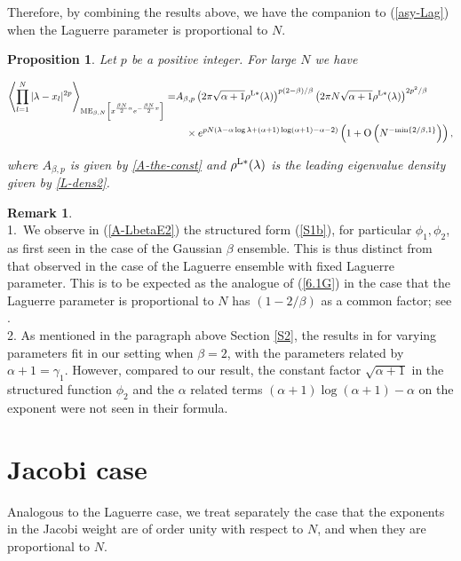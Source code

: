 \documentclass[11pt,a4paper]{article}
\numberwithin{equation}{section} %
\theoremstyle{plain}
\newtheorem{prop}{Proposition}
\theoremstyle{definition}
\newtheorem{remark}{Remark}
\numberwithin{prop}{section}
\numberwithin{cor}{section}
\numberwithin{remark}{section}
\begin{document}
Therefore, by combining the results above, we have the companion to (\ref{asy-Lag})
when the Laguerre parameter is proportional to $N$.
	\begin{prop}\label{pro-LbE2}
	Let $p$ be a positive integer. For large $N$ we have
	\begin{small}
	    \begin{align}\label{A-LbetaE2}
		\begin{aligned}
			\left\langle\prod_{l=1}^N |\lambda-x_l|^{2 p}\right\rangle_{\mathrm{ME}_{\beta, N}\left[x^{\frac{\beta N}{2}\alpha}e^{-{\beta N\over 2} x}\right]}=&A_{\beta, p}\left({2\pi\sqrt{\alpha+1}} \rho^{\rm L*}(\lambda)\right)^{p(2-\beta) / \beta}\left({2\pi N\sqrt{\alpha+1}} \rho^{\rm L*}(\lambda)\right)^{2 p^2 / \beta} \\
			&\quad\times e^{pN \left(\lambda-\alpha\log\lambda+(\alpha+1)\log(\alpha+1)-\alpha -2\right)}\left(1+\mathrm{O}\left( N^{-\mathrm{min}\{2/\beta,1\}}\right)\right),
		\end{aligned}
	\end{align}
	\end{small}
	where $A_{\beta, p}$ is given by \eqref{A-the-const} and $\rho^{\rm L*}(\lambda)$ is the leading eigenvalue density given by \eqref{L-dens2}.
\end{prop}


\begin{remark}\label{R-C1} ${}$ \\
1.~We observe in (\ref{A-LbetaE2}) the structured form (\ref{S1b}), for particular $\phi_1, \phi_2$, as first seen in the case of the Gaussian $\beta$ ensemble. This is thus distinct
from that observed in the case of the Laguerre ensemble with fixed Laguerre parameter. This is to be expected as the analogue of (\ref{6.1G}) in the case that the Laguerre parameter is proportional to $N$ has $(1-2/\beta)$ as a common
factor; see \cite[Prop.~3.15]{FRW17}. \\
2. As mentioned in the paragraph above Section \ref{S2}, the results in \cite[Theorem~4.3]{DL14} for varying parameters fit in our setting when $\beta=2$, with the parameters related by $\alpha+1=\gamma_1$. However, compared to our result, the constant factor $\sqrt{\alpha+1}$ in the structured function $\phi_2$ and the $\alpha$ related terms $(\alpha+1)\log (\alpha+1)-\alpha $ on the exponent were not seen in their formula.



\end{remark}

\section{Jacobi case}\label{Jac-sec}
Analogous to the Laguerre case, we treat separately the case that the exponents in
the Jacobi weight are of order unity with respect to $N$, and when they are
proportional to $N$.
\end{document}
